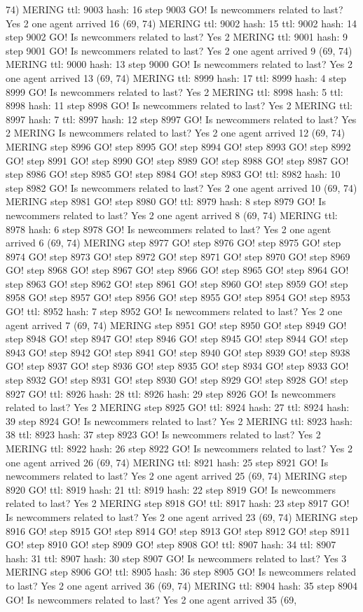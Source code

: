 74) MERING ttl: 9003 hash: 16 step 9003 GO! Is newcommers related to last? Yes 2 one agent arrived 16 (69, 74) MERING ttl: 9002 hash: 15 ttl: 9002 hash: 14 step 9002 GO! Is newcommers related to last? Yes 2 MERING ttl: 9001 hash: 9 step 9001 GO! Is newcommers related to last? Yes 2 one agent arrived 9 (69, 74) MERING ttl: 9000 hash: 13 step 9000 GO! Is newcommers related to last? Yes 2 one agent arrived 13 (69, 74) MERING ttl: 8999 hash: 17 ttl: 8999 hash: 4 step 8999 GO! Is newcommers related to last? Yes 2 MERING ttl: 8998 hash: 5 ttl: 8998 hash: 11 step 8998 GO! Is newcommers related to last? Yes 2 MERING ttl: 8997 hash: 7 ttl: 8997 hash: 12 step 8997 GO! Is newcommers related to last? Yes 2 MERING Is newcommers related to last? Yes 2 one agent arrived 12 (69, 74) MERING step 8996 GO! step 8995 GO! step 8994 GO! step 8993 GO! step 8992 GO! step 8991 GO! step 8990 GO! step 8989 GO! step 8988 GO! step 8987 GO! step 8986 GO! step 8985 GO! step 8984 GO! step 8983 GO! ttl: 8982 hash: 10 step 8982 GO! Is newcommers related to last? Yes 2 one agent arrived 10 (69, 74) MERING step 8981 GO! step 8980 GO! ttl: 8979 hash: 8 step 8979 GO! Is newcommers related to last? Yes 2 one agent arrived 8 (69, 74) MERING ttl: 8978 hash: 6 step 8978 GO! Is newcommers related to last? Yes 2 one agent arrived 6 (69, 74) MERING step 8977 GO! step 8976 GO! step 8975 GO! step 8974 GO! step 8973 GO! step 8972 GO! step 8971 GO! step 8970 GO! step 8969 GO! step 8968 GO! step 8967 GO! step 8966 GO! step 8965 GO! step 8964 GO! step 8963 GO! step 8962 GO! step 8961 GO! step 8960 GO! step 8959 GO! step 8958 GO! step 8957 GO! step 8956 GO! step 8955 GO! step 8954 GO! step 8953 GO! ttl: 8952 hash: 7 step 8952 GO! Is newcommers related to last? Yes 2 one agent arrived 7 (69, 74) MERING step 8951 GO! step 8950 GO! step 8949 GO! step 8948 GO! step 8947 GO! step 8946 GO! step 8945 GO! step 8944 GO! step 8943 GO! step 8942 GO! step 8941 GO! step 8940 GO! step 8939 GO! step 8938 GO! step 8937 GO! step 8936 GO! step 8935 GO! step 8934 GO! step 8933 GO! step 8932 GO! step 8931 GO! step 8930 GO! step 8929 GO! step 8928 GO! step 8927 GO! ttl: 8926 hash: 28 ttl: 8926 hash: 29 step 8926 GO! Is newcommers related to last? Yes 2 MERING step 8925 GO! ttl: 8924 hash: 27 ttl: 8924 hash: 39 step 8924 GO! Is newcommers related to last? Yes 2 MERING ttl: 8923 hash: 38 ttl: 8923 hash: 37 step 8923 GO! Is newcommers related to last? Yes 2 MERING ttl: 8922 hash: 26 step 8922 GO! Is newcommers related to last? Yes 2 one agent arrived 26 (69, 74) MERING ttl: 8921 hash: 25 step 8921 GO! Is newcommers related to last? Yes 2 one agent arrived 25 (69, 74) MERING step 8920 GO! ttl: 8919 hash: 21 ttl: 8919 hash: 22 step 8919 GO! Is newcommers related to last? Yes 2 MERING step 8918 GO! ttl: 8917 hash: 23 step 8917 GO! Is newcommers related to last? Yes 2 one agent arrived 23 (69, 74) MERING step 8916 GO! step 8915 GO! step 8914 GO! step 8913 GO! step 8912 GO! step 8911 GO! step 8910 GO! step 8909 GO! step 8908 GO! ttl: 8907 hash: 34 ttl: 8907 hash: 31 ttl: 8907 hash: 30 step 8907 GO! Is newcommers related to last? Yes 3 MERING step 8906 GO! ttl: 8905 hash: 36 step 8905 GO! Is newcommers related to last? Yes 2 one agent arrived 36 (69, 74) MERING ttl: 8904 hash: 35 step 8904 GO! Is newcommers related to last? Yes 2 one agent arrived 35 (69, 